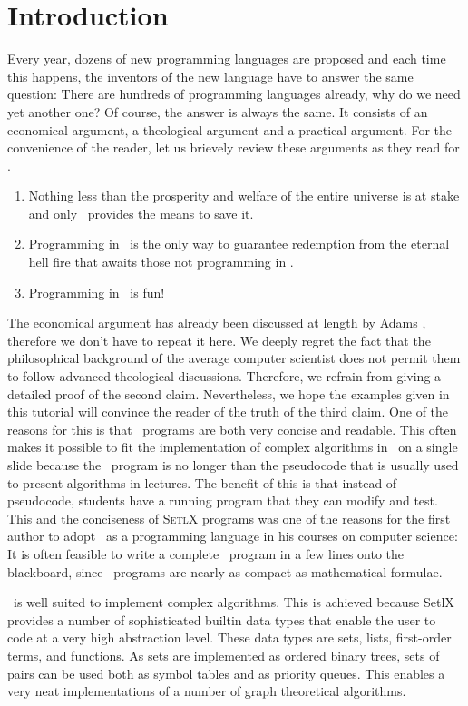 \chapter{Introduction}
Every year, dozens of new programming languages are proposed and each time this
happens,  the inventors of the new language have to answer the same question: 
There are hundreds of programming languages already, why do we need yet another one?  
Of course, the answer is always the same.  It consists of an economical argument, a
theological argument and a practical argument. For the
convenience of the reader, let us brievely review these arguments as they read for \setlx.  
\begin{enumerate}
\item Nothing less than the prosperity and welfare of the entire universe is at
      stake and only \setlx\ provides the means to save it.
\item Programming in \setlx\ is the only way to guarantee redemption from 
      the eternal hell fire that awaits those not programming in \setlx.
\item Programming in \setlx\ is fun!
\end{enumerate}
The economical argument has already been discussed at length by Adams \cite{adams:1980},
therefore we don't have to repeat it here.   We deeply
regret the fact that the philosophical background of the average computer scientist does not permit
them to follow advanced theological discussions.  Therefore, we refrain from giving a
detailed proof of the second claim.  Nevertheless, we hope the examples given in this
tutorial will convince the reader of the truth of the third claim.
  One of the reasons for this is that \setlx\ programs are both very concise and
readable.  This often makes it possible to fit the implementation of complex algorithms in \setlx\ on a
single slide because the \setlx\ program is no longer than the pseudocode that is usually used to
present algorithms in lectures.  The benefit of this is that instead of pseudocode, students have a
running program that they can modify and test. This and the
conciseness of \textsc{SetlX} programs was one of the reasons for
the first author to adopt \setlx\ as a programming language in his courses on computer
science: It is often feasible to write a complete \setlx\ program in a few lines 
onto the blackboard, since \setlx\ programs are nearly as compact as mathematical formulae.


\setlx\ is well suited to implement complex algorithms. This is achieved because SetlX
provides a number of sophisticated builtin data types that enable the user to code at a very high
abstraction level.
These data types are sets, lists, first-order terms, and functions.  
As sets are implemented as ordered binary trees, sets of pairs can be used both as symbol
tables and as priority queues.  This enables a very neat implementations 
of a number of graph theoretical algorithms.

